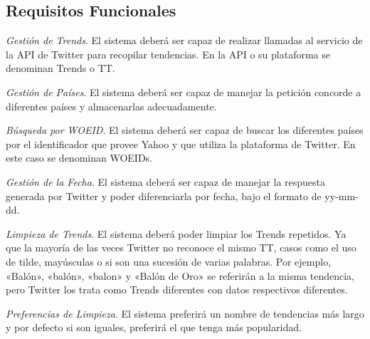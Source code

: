 \subsection{Requisitos Funcionales}

\begin{enumerate}
    { \renewcommand\labelenumi{R.F. \theenumi}
    \item
    \textit{Gestión de Trends}. El sistema deberá ser capaz de realizar llamadas al servicio de la API de Twitter para recopilar tendencias. En la API o su plataforma se denominan Trends o \ac{TT}.
        \begin{enumerate}{\renewcommand{\labelenumii}{R.F. \arabic{enumi}.\arabic{enumii}}
        \item
        \textit{Gestión de Países}. El sistema deberá ser capaz de manejar la petición concorde a diferentes países y almacenarlas adecuadamente.
            \begin{enumerate}{\renewcommand{\labelenumiii}{R.F. \arabic{enumi}.\arabic{enumii}.\arabic{enumiii}}
            \item
            \textit{Búsqueda por WOEID}. El sistema deberá ser capaz de buscar los diferentes países por el identificador que provee Yahoo y que utiliza la plataforma de Twitter. En este caso se denominan WOEIDs.
            }\end{enumerate}
        \item
        \textit{Gestión de la Fecha}. El sistema deberá ser capaz de manejar la respuesta generada por Twitter y poder diferenciarla por fecha, bajo el formato de yy-mm-dd.
        \item
        \textit{Limpieza de Trends}. El sistema deberá poder limpiar los Trends repetidos. Ya que la mayoría de las veces Twitter no reconoce el mismo \ac{TT}, casos como el uso de tilde, mayúsculas o si son una sucesión de varias palabras. Por ejemplo, «Balón», «balón», «balon» y «Balón de Oro» se referirán a la misma tendencia, pero Twitter los trata como Trends diferentes con datos respectivos diferentes.
        \begin{enumerate}{\renewcommand{\labelenumiii}{R.F. \arabic{enumi}.\arabic{enumii}.\arabic{enumiii}}
            \item
            \textit{Preferencias de Limpieza}. El sistema preferirá un nombre de tendencias más largo y por defecto si son iguales, preferirá el que tenga más popularidad.
            }\end{enumerate}
        \item
}
\end{enumerate}}
\end{enumerate}
